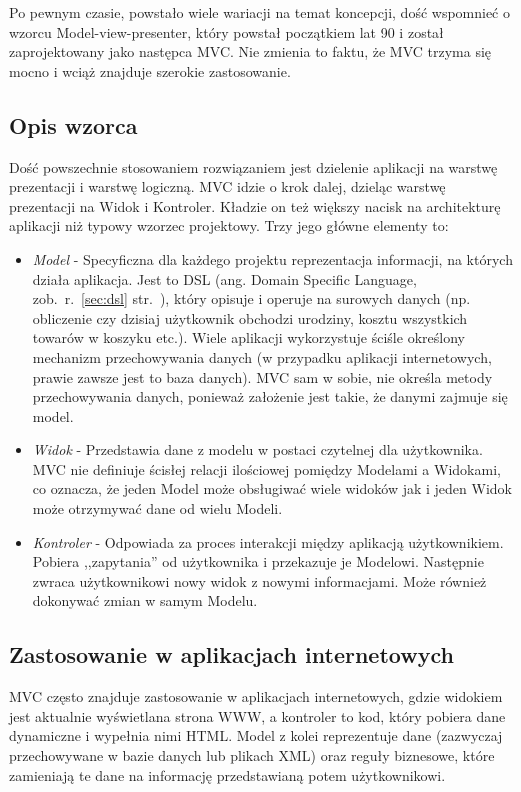 \documentclass[a4paper,12pt,oneside]{report}
\begin{document}
Po pewnym czasie, powstało wiele wariacji na temat koncepcji, dość wspomnieć o wzorcu Model-view-presenter, który powstał początkiem lat 90 i został zaprojektowany jako następca MVC. Nie zmienia to faktu, że MVC trzyma się mocno i wciąż znajduje szerokie zastosowanie.

\subsection{Opis wzorca}
\label{subsec:mvc-opis}
Dość powszechnie stosowaniem rozwiązaniem jest dzielenie aplikacji na warstwę prezentacji i warstwę logiczną. MVC idzie o krok dalej, dzieląc warstwę prezentacji na Widok i Kontroler. Kładzie on też większy nacisk na architekturę aplikacji niż typowy wzorzec projektowy. Trzy jego główne elementy to:
\begin{itemize}
  \item \emph{Model} - Specyficzna dla każdego projektu reprezentacja informacji, na których działa aplikacja. Jest to DSL (ang. Domain Specific Language, zob.~r.~\ref{sec:dsl} str.~\pageref{sec:dsl}), który opisuje i operuje na surowych danych (np. obliczenie czy dzisiaj użytkownik obchodzi urodziny, kosztu wszystkich towarów w koszyku etc.). Wiele aplikacji wykorzystuje ściśle określony mechanizm przechowywania danych (w przypadku aplikacji internetowych, prawie zawsze jest to baza danych). MVC sam w sobie, nie określa metody przechowywania danych, ponieważ założenie jest takie, że danymi zajmuje się model.
  \item \emph{Widok} - Przedstawia dane z modelu w postaci czytelnej dla użytkownika. MVC nie definiuje ścisłej relacji ilościowej pomiędzy Modelami a Widokami, co oznacza, że jeden Model może obsługiwać wiele widoków jak i jeden Widok może otrzymywać dane od wielu Modeli.
  \item \emph{Kontroler} - Odpowiada za proces interakcji między aplikacją użytkownikiem. Pobiera ,,zapytania'' od użytkownika i przekazuje je Modelowi. Następnie zwraca użytkownikowi nowy widok z nowymi informacjami. Może również dokonywać zmian w samym Modelu.
\end{itemize}

\subsection{Zastosowanie w aplikacjach internetowych}
\label{subsec:mvc-web}
MVC często znajduje zastosowanie w aplikacjach internetowych, gdzie widokiem jest aktualnie wyświetlana strona WWW, a kontroler to kod, który pobiera dane dynamiczne i wypełnia nimi HTML. Model z kolei reprezentuje dane (zazwyczaj przechowywane w bazie danych lub plikach XML) oraz reguły biznesowe, które zamieniają te dane na informację przedstawianą potem użytkownikowi.
\end{document}
